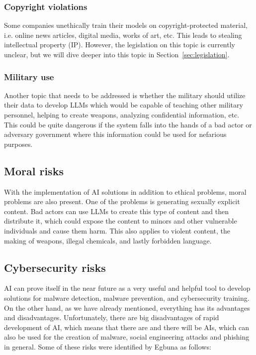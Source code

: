 \subsubsection*{Copyright violations}

Some companies unethically train their models on copyright-protected material, i.e. online news articles, digital media, works of art, etc. This leads to stealing intellectual property (IP). However, the legislation on this topic is currently unclear, but we will dive deeper into this topic in Section~\ref{sec:legislation}.

\subsubsection*{Military use}

Another topic that needs to be addressed is whether the military should utilize their data to develop LLMs which would be capable of teaching other military personnel, helping to create weapons, analyzing confidential information, etc. This could be quite dangerous if the system falls into the hands of a bad actor or adversary government where this information could be used for nefarious purposes.


\subsection{Moral risks}
With the implementation of AI solutions in addition to ethical problems, moral problems are also present. One of the problems is generating sexually explicit content. Bad actors can use LLMs to create this type of content and then distribute it, which could expose the content to minors and other vulnerable individuals and cause them harm. This also applies to violent content, the making of weapons, illegal chemicals, and lastly forbidden language.


\subsection{Cybersecurity risks}
AI can prove itself in the near future as a very useful and helpful tool to develop solutions for malware detection, malware prevention, and cybersecurity training. On the other hand, as we have already mentioned, everything has its advantages and disadvantages. Unfortunately, there are big disadvantages of rapid development of AI, which means that there are and there will be AIs, which can also be used for the creation of malware, social engineering attacks and phishing in general. Some of these risks were identified by Egbuna\cite{Princess-Egbuna_2021} as follows:

